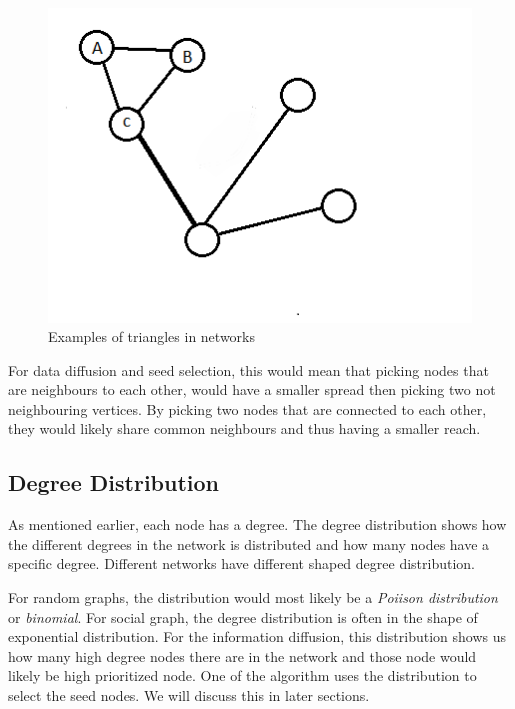 \begin{figure}
	\includegraphics{Figures/triangleStruc}
	\caption{Examples of triangles in networks} 
	\label{fig:triangleStruc}
\end{figure}


For data diffusion and seed selection, this would mean that picking nodes that are neighbours to each other, would have a smaller spread then picking two not neighbouring vertices. By picking two nodes that are connected to each other, they would likely share common neighbours and thus having a smaller reach.  

\subsection{Degree Distribution} \label{degreeDis}
As mentioned earlier, each node has a degree. The degree distribution shows how the different degrees in the network is distributed and how many nodes have a specific degree. Different networks have different shaped degree distribution.

For random graphs, the distribution would most likely be a \textit{Poiison distribution} or \textit{binomial}\cite{ComplexNetwork2003}. For social graph, the degree distribution is often in the shape of exponential distribution. For the information diffusion, this distribution shows us how many high degree nodes there are in the network and those node would likely be high prioritized node. One of the algorithm uses the distribution to select the seed nodes. We will discuss this in later sections.  




